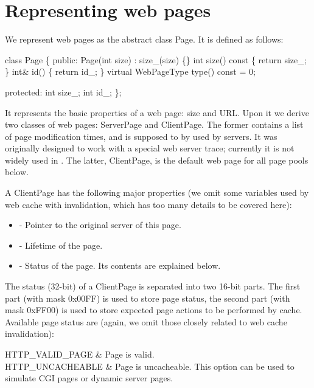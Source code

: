 \section{Representing web pages}

We represent web pages as the abstract class Page. It is defined as follows:

\begin{program}
class Page \{
public:
        Page(int size) : size_(size) \{\}
        int size() const \{ return size_; \}
        int& id() \{ return id_; \}
        virtual WebPageType type() const = 0;

protected:
        int size_;
        int id_;
\};
\end{program}

It represents the basic properties of a web page: size and URL. Upon
it we derive two classes of web pages: ServerPage and ClientPage. The
former contains a list of page modification times, and is supposed to
by used by servers. It was originally designed to work with a special
web server trace; currently it is not widely used in \ns. The latter,
ClientPage, is the default web page for all page pools below. 

A ClientPage has the following major properties (we omit some
variables used by web cache with invalidation, which has too many
details to be covered here):

\begin{itemize}
\item {} - Pointer to the original server of this
  page. 
\item {} - Lifetime of the page.
\item {} - Status of the page. Its contents are
  explained below.
\end{itemize}

The status (32-bit) of a ClientPage is separated into two 16-bit
parts. The first part (with mask 0x00FF) is used to store page
status, the second part (with mask 0xFF00) is used to store expected
page actions to be performed by cache. Available page status are (again,
we omit those closely related to web cache invalidation):

\begin{alist}
HTTP\_VALID\_PAGE & Page is valid. \\
HTTP\_UNCACHEABLE & Page is uncacheable. This option can be used to
simulate CGI pages or dynamic server pages. \\
\end{alist}

